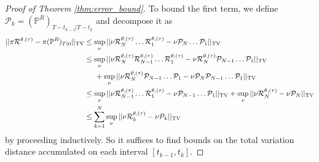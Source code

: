 \documentclass{article}
\begin{document}
\begin{proof}[Proof of Theorem \ref{thm:error_bound}]
To bound the first term, we define $\mathcal{P}_k = (\mathbb{P}^R)_{T - t_{k-1} | T - t_k}$ and decompose it as
\begin{align}
    ||\pi \mathcal{R}^{\theta, (\tau)} - \pi (\mathbb{P}^R)_{T|0}||_{\textup{TV}} &\leq \sup_{\nu} ||\nu \mathcal{R}^{\theta, (\tau)}_N \dots \mathcal{R}^{\theta, (\tau)}_1 - \nu \mathcal{P}_N \dots \mathcal{P}_1||_{\textup{TV}} \\
    &\leq \sup_\nu ||\nu \mathcal{R}^{\theta, (\tau)}_N \mathcal{R}^{\theta, (\tau)}_{N-1} \dots \mathcal{R}^{\theta, (\tau)}_1 - \nu \mathcal{R}^{\theta, (\tau)}_N \mathcal{P}_{N-1} \dots \mathcal{P}_1||_{\textup{TV}} \\
    &\hspace{5mm} + \sup_\nu ||\nu \mathcal{R}^{\theta, (\tau)}_N \mathcal{P}_{N-1} \dots \mathcal{P}_1 - \nu \mathcal{P}_N \mathcal{P}_{N-1} \dots \mathcal{P}_1||_{\textup{TV}} \\
    &\leq \sup_\nu ||\nu \mathcal{R}^{\theta, (\tau)}_{N-1} \dots \mathcal{R}^{\theta, (\tau)}_1 - \nu \mathcal{P}_{N-1} \dots \mathcal{P}_1||_{\textup{TV}} + \sup_\nu ||\nu \mathcal{R}^{\theta, (\tau)}_N - \nu \mathcal{P}_N||_{\textup{TV}} \\
    &\leq \sum_{k = 1}^N \sup_\nu ||\nu \mathcal{R}^{\theta, (\tau)}_k - \nu \mathcal{P}_k||_{\textup{TV}}
\end{align}
by proceeding inductively. So it suffices to find bounds on the total variation distance accumulated on each interval $[t_{k-1}, t_k]$.


\end{proof}
\end{document}
